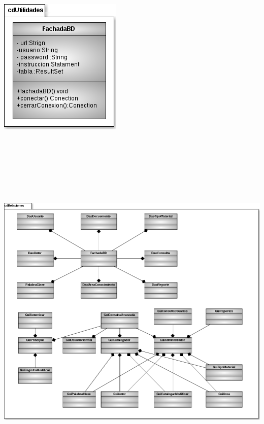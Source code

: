 \documentclass[11pt]{article}
\begin{document}
			\begin{minipage}[c]{1\linewidth}
				\centering
				\includegraphics[scale=0.7]{DiagramasClase/Demas}
			\end{minipage}
		
			\begin{minipage}[c]{1\linewidth}
				\centering
				\includegraphics[width=17cm, height=18cm]{DiagramasClase/relaciones}
			\end{minipage}
\end{document}
